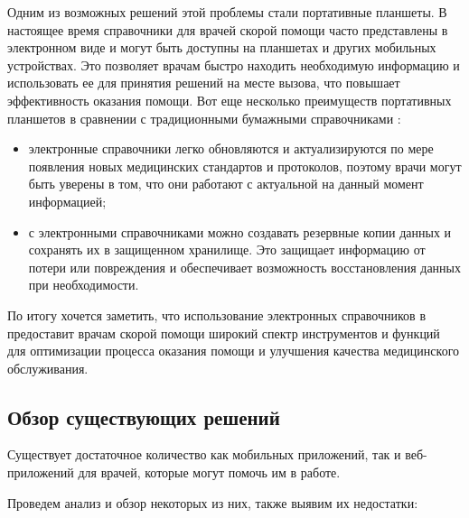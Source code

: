Одним из возможных решений этой проблемы стали портативные планшеты. В настоящее время справочники для врачей скорой помощи часто представлены в электронном виде и могут быть доступны на планшетах и других мобильных устройствах. Это позволяет врачам быстро находить необходимую информацию и использовать ее для принятия решений на месте вызова, что повышает эффективность оказания помощи.
Вот еще несколько преимуществ портативных планшетов в сравнении с традиционными бумажными справочниками :
\begin{itemize}
    \item электронные справочники легко обновляются и актуализируются по мере появления новых медицинских стандартов и протоколов, поэтому врачи могут быть уверены в том, что они работают с актуальной на данный момент информацией;
    \item с электронными справочниками можно создавать резервные копии данных и сохранять их в защищенном хранилище. Это защищает информацию от потери или повреждения и обеспечивает возможность восстановления данных при необходимости.
\end{itemize}
	По итогу хочется заметить, что использование электронных справочников в предоставит врачам скорой помощи широкий спектр инструментов и функций для оптимизации процесса оказания помощи и улучшения качества медицинского обслуживания.

\subsection{Обзор существующих решений}

Существует достаточное количество как мобильных приложений, так и веб-приложений для врачей, которые могут помочь им в работе.

Проведем анализ и обзор некоторых из них, также выявим их недостатки:

